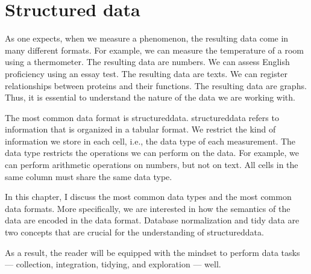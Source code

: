 \chapter{Structured data}
\label{chap:data}
\glsresetall


As one expects, when we measure a phenomenon, the resulting data come in many different
formats.  For example, we can measure the temperature of a room using a thermometer.  The
resulting data are numbers.  We can assess English proficiency using an essay test.  The
resulting data are texts.  We can register relationships between proteins and their
functions.  The resulting data are graphs.  Thus, it is essential to understand the nature
of the data we are working with.

The most common data format is \gls{structureddata}.  \Gls{structureddata} refers to
information that is organized in a tabular format.
We restrict the kind of information we store in each cell, i.e., the data type of each
measurement.  The data type restricts the operations we can
perform on the data.  For example, we can perform arithmetic operations on numbers, but
not on text.  All cells in the same column must share the same data type.

In this chapter, I discuss the most common data types and the most common data formats.
More specifically, we are interested in how the semantics of the data are encoded in the
data format.  Database normalization and tidy data are two concepts that are crucial for
the understanding of \gls{structureddata}.

As a result, the reader will be equipped with the mindset to perform data tasks
--- collection, integration, tidying, and exploration --- well.


